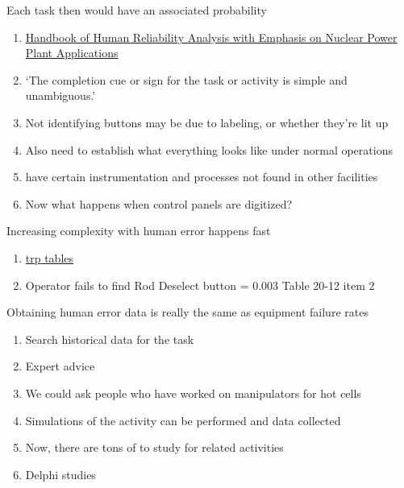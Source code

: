 \documentclass[aspectratio=1610,pdftex,dvipsnames,compress,xcolor={dvipsnames}]{beamer}
\newcommand{\acs}{\acrshort} %
\newcommand{\acsp}{\acrshortpl} %
\begin{document}
\addtocounter{framenumber}{-1}
\begin{frame}{Each task then would have an associated probability}
    \begin{enumerate}[series=outerlist,topsep=0pt,itemsep=15pt,leftmargin=*,label=(\arabic*)]
        \item[]\href{https://uidaho.pressbooks.pub/riskassessment/chapter/human-reliability-analysis/}{Handbook of Human Reliability Analysis with Emphasis on Nuclear Power Plant Applications}
        \item[]`The completion cue or sign for the task or activity is simple and unambiguous.'
        \item[]Not identifying buttons may be due to labeling, or whether they're lit up
        \item[]Also need to establish what everything looks like under normal operations
        \item[]\acsp{npp} have certain instrumentation and processes not found in other facilities
        \item[]Now what happens when control panels are digitized?  
    \end{enumerate}
\end{frame}


\begin{frame}{Increasing complexity with human error happens fast}
    \begin{enumerate}[series=outerlist,topsep=0pt,itemsep=21pt,leftmargin=*,label=(\arabic*)]
        \item[]\href{https://uidaho.pressbooks.pub/riskassessment/chapter/human-reliability-analysis/}{\acs{trp} tables}
        \item[]Operator fails to find Rod Deselect button = 0.003 Table 20-12 item 2
    \end{enumerate}
\end{frame}


\begin{frame}{Obtaining human error data is really the same as equipment failure rates}
    \begin{enumerate}[series=outerlist,topsep=0pt,itemsep=21pt,leftmargin=*,label=(\arabic*)]
        \item[]Search historical data for the task
        \item[]Expert advice
        \item[]We could ask people who have worked on manipulators for hot cells
        \item[]Simulations of the activity can be performed and data collected 
        \item[]Now, there are tons of \acsp{pra} to study for related activities
        \item[]Delphi studies
    \end{enumerate}
\end{frame}
\end{document}
